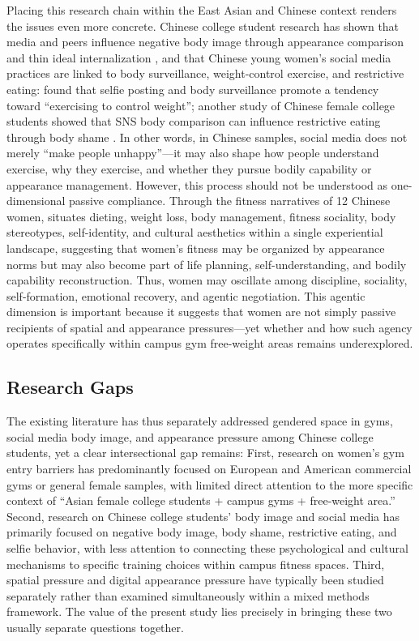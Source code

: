 Placing this research chain within the East Asian and Chinese context renders the issues even more concrete.
Chinese college student research has shown that media and peers influence negative body image through appearance comparison and thin ideal internalization \parencite{shen2022media}, and that Chinese young women's social media practices are linked to body surveillance, weight-control exercise, and restrictive eating:
\textcite{yao2020selfie} found that selfie posting and body surveillance promote a tendency toward ``exercising to control weight'';
another study of Chinese female college students showed that SNS body comparison can influence restrictive eating through body shame \parencite{yao2021bodyimage}.
In other words, in Chinese samples, social media does not merely ``make people unhappy''---it may also shape how people understand exercise, why they exercise, and whether they pursue bodily capability or appearance management.
However, this process should not be understood as one-dimensional passive compliance.
Through the fitness narratives of 12 Chinese women, \textcite{xiong2021fanshen} situates dieting, weight loss, body management, fitness sociality, body stereotypes, self-identity, and cultural aesthetics within a single experiential landscape, suggesting that women's fitness may be organized by appearance norms but may also become part of life planning, self-understanding, and bodily capability reconstruction.
Thus, women may oscillate among discipline, sociality, self-formation, emotional recovery, and agentic negotiation.
This agentic dimension is important because it suggests that women are not simply passive recipients of spatial and appearance pressures---yet whether and how such agency operates specifically within campus gym free-weight areas remains underexplored.

\subsection{Research Gaps}

The existing literature has thus separately addressed gendered space in gyms, social media body image, and appearance pressure among Chinese college students, yet a clear intersectional gap remains:
First, research on women's gym entry barriers has predominantly focused on European and American commercial gyms or general female samples, with limited direct attention to the more specific context of ``Asian female college students + campus gyms + free-weight area.''
Second, research on Chinese college students' body image and social media has primarily focused on negative body image, body shame, restrictive eating, and selfie behavior, with less attention to connecting these psychological and cultural mechanisms to specific training choices within campus fitness spaces.
Third, spatial pressure and digital appearance pressure have typically been studied separately rather than examined simultaneously within a mixed methods framework.
The value of the present study lies precisely in bringing these two usually separate questions together.

